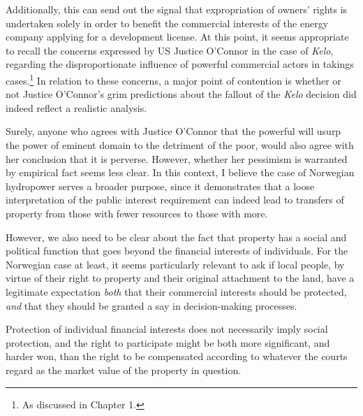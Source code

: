 {Additionally, this can send out the signal that expropriation of owners' rights is undertaken solely in order to benefit the commercial interests of the energy company applying for a development license. At this point, it seems appropriate to recall the concerns expressed by US Justice O'Connor in the case of {\it Kelo}, regarding the disproportionate influence of powerful commercial actors in takings cases.\footnote{As discussed in Chapter 1.} In relation to these concerns, a major point of contention is  whether or not Justice O'Connor's grim predictions about the fallout of the {\it Kelo} decision did indeed reflect a realistic analysis. 

Surely, anyone who agrees with Justice O'Connor that the powerful will usurp the power of eminent domain to the detriment of the poor, would also agree with her conclusion that it is perverse. However, whether her pessimism is warranted by empirical fact seems less clear. In this context, I believe the case of Norwegian hydropower serves a broader purpose, since it demonstrates that a loose interpretation of the public interest requirement can  indeed lead to transfers of property from those with fewer resources to those with more.

However, we also need to be clear about the fact that property has a social and political function that goes beyond the financial interests of individuals. For the Norwegian case at least, it seems particularly relevant to ask if local people, by virtue of their right to property and their original attachment to the land, have a legitimate expectation \emph{both} that their commercial interests should be protected, \emph{and} that they should be granted a say in decision-making processes. 

Protection of individual financial interests does not necessarily imply social protection, and the right to participate might be both more significant, and harder won, than the right to be compensated according to whatever the courts regard as the market value of the property in question.

}
